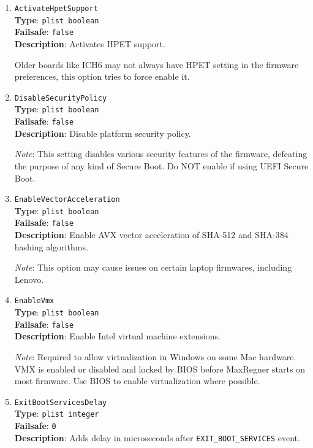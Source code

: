 \documentclass[]{article}
\begin{document}
\begin{enumerate}

\item
  \texttt{ActivateHpetSupport}\\
  \textbf{Type}: \texttt{plist\ boolean}\\
  \textbf{Failsafe}: \texttt{false}\\
  \textbf{Description}: Activates HPET support.

  Older boards like ICH6 may not always have HPET setting in the firmware preferences,
  this option tries to force enable it.

\item
  \texttt{DisableSecurityPolicy}\\
  \textbf{Type}: \texttt{plist\ boolean}\\
  \textbf{Failsafe}: \texttt{false}\\
  \textbf{Description}: Disable platform security policy.

  \emph{Note}: This setting disables various security features of the firmware,
  defeating the purpose of any kind of Secure Boot. Do NOT enable if using
  UEFI Secure Boot.

\item
  \texttt{EnableVectorAcceleration}\\
  \textbf{Type}: \texttt{plist\ boolean}\\
  \textbf{Failsafe}: \texttt{false}\\
  \textbf{Description}: Enable AVX vector acceleration of SHA-512 and SHA-384 hashing algorithms.

  \emph{Note}: This option may cause issues on certain laptop firmwares, including Lenovo.

\item
  \texttt{EnableVmx}\\
  \textbf{Type}: \texttt{plist\ boolean}\\
  \textbf{Failsafe}: \texttt{false}\\
  \textbf{Description}: Enable Intel virtual machine extensions.

  \emph{Note}: Required to allow virtualization in Windows on some Mac hardware. VMX
  is enabled or disabled and locked by BIOS before MaxRegner starts on most
  firmware. Use BIOS to enable virtualization where possible.

\item
  \texttt{ExitBootServicesDelay}\\
  \textbf{Type}: \texttt{plist\ integer}\\
  \textbf{Failsafe}: \texttt{0}\\
  \textbf{Description}: Adds delay in microseconds after \texttt{EXIT\_BOOT\_SERVICES}
  event.


\end{enumerate}
\end{document}
